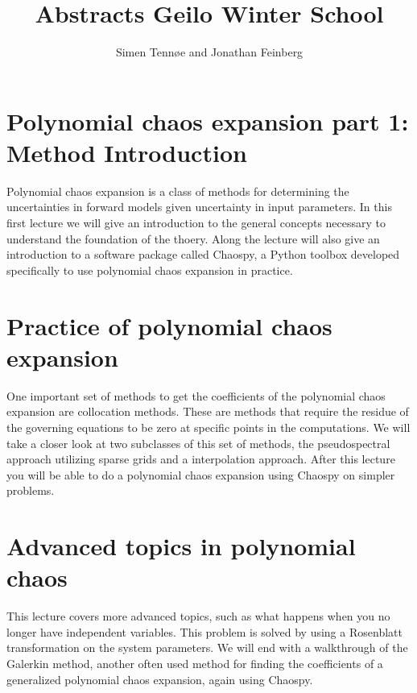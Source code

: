 \documentclass[a4paper,10pt]{article}
\title{Abstracts Geilo Winter School}
\author{Simen Tennøe and Jonathan Feinberg}
\begin{document}
\maketitle
\newpage


\section{Polynomial chaos expansion part 1: Method Introduction}

Polynomial chaos expansion is a class of methods for determining the
uncertainties in forward models given uncertainty in input parameters.
In this first lecture we will give an introduction to the general
concepts necessary to understand the foundation of the thoery.
Along the lecture will also give an introduction to a software
package called Chaospy, a Python toolbox developed specifically to
use polynomial chaos expansion in practice.



\section{Practice of polynomial chaos expansion}
One important set of methods to get the coefficients of the
polynomial chaos expansion are collocation methods.
These are methods that require the residue of the governing
equations to be zero at specific points in the computations.
We will take a closer look at two subclasses of this set of
methods, the pseudospectral approach utilizing sparse grids and a
interpolation approach.  After this lecture you will be able to do
a polynomial chaos expansion using Chaospy on simpler problems.




\section{Advanced topics in polynomial chaos}
This lecture covers more advanced topics, such as what happens when
you no longer have independent variables.
This problem is solved by using a Rosenblatt transformation on the
system parameters.
We will end with a walkthrough of the Galerkin method, another
often used method for finding the coefficients of a generalized
polynomial chaos expansion, again using Chaospy.
\end{document}
